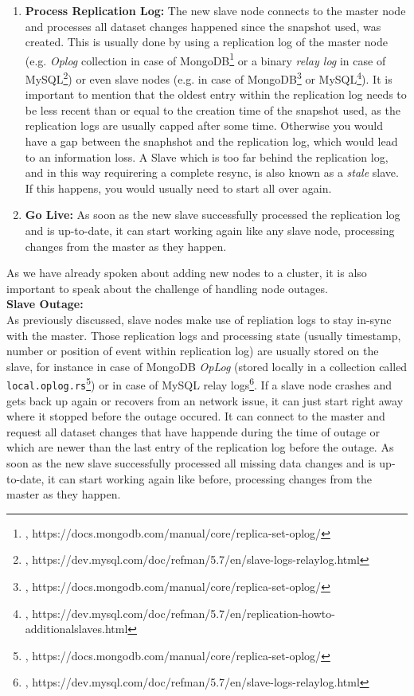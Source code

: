 {\begin{enumerate}
\item \textbf{Process Replication Log:} The new slave node connects to the master node and processes all dataset changes happened since the snapshot used, was created. This is usually done by using a replication log of the master node (e.g. \textit{Oplog} collection in case of MongoDB\footnote{\cite{MDBRSOL}, https://docs.mongodb.com/manual/core/replica-set-oplog/} or a binary \textit{relay log} in case of MySQL\footnote{\cite{MYSQLRL}, https://dev.mysql.com/doc/refman/5.7/en/slave-logs-relaylog.html}) or even slave nodes (e.g. in case of MongoDB\footnote{\cite{MDBRSOL}, https://docs.mongodb.com/manual/core/replica-set-oplog/} or MySQL\footnote{\cite{MYSQLNS}, https://dev.mysql.com/doc/refman/5.7/en/replication-howto-additionalslaves.html}). It is important to mention that the oldest entry within the replication log needs to be less recent than or equal to the creation time of the snapshot used, as the replication logs are usually capped after some time. Otherwise you would have a gap between the snaphshot and the replication log, which would lead to an information loss. A Slave which is too far behind the replication log, and in this way requirering a complete resync, is also known as a \textit{stale} slave. If this happens, you would usually need to start all over again.
\item \textbf{Go Live:} As soon as the new slave successfully processed the replication log and is up-to-date, it can start working again like any slave node, processing changes from the master as they happen.\\
\end{enumerate}

As we have already spoken about adding new nodes to a cluster, it is also important to speak about the challenge of handling node outages.\\

\textbf{Slave Outage:}\\
As previously discussed, slave nodes make use of repliation logs to stay in-sync with the master. Those replication logs and processing state (usually timestamp, number or position of event within replication log) are usually stored on the slave, for instance in case of MongoDB \textit{OpLog} (stored locally in a collection called \lstinline{local.oplog.rs}\footnote{\cite{MDBRSOL}, https://docs.mongodb.com/manual/core/replica-set-oplog/}) or in case of MySQL relay logs\footnote{\cite{MYSQLRL}, https://dev.mysql.com/doc/refman/5.7/en/slave-logs-relaylog.html}. If a slave node crashes and gets back up again or recovers from an network issue, it can just start right away where it stopped before the outage occured. It can connect to the master and request all dataset changes that have happende during the time of outage or which are newer than the last entry of the replication log before the outage. As soon as the new slave successfully processed all missing data changes and is up-to-date, it can start working again like before, processing changes from the master as they happen.\\

}
